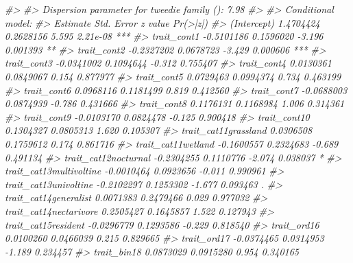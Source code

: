 \documentclass[
]{article}
\newenvironment{Shaded}{\begin{snugshade}}{\end{snugshade}}
\newcommand{\CommentTok}[1]{\textcolor[rgb]{0.56,0.35,0.01}{\textit{#1}}}
\begin{document}
\begin{Shaded}
\begin{Highlighting}[]
\CommentTok{\#\textgreater{} }
\CommentTok{\#\textgreater{} Dispersion parameter for tweedie family (): 7.98 }
\CommentTok{\#\textgreater{} }
\CommentTok{\#\textgreater{} Conditional model:}
\CommentTok{\#\textgreater{}                                 Estimate Std. Error z value Pr(\textgreater{}|z|)    }
\CommentTok{\#\textgreater{} (Intercept)                    1.4704424  0.2628156   5.595 2.21e{-}08 ***}
\CommentTok{\#\textgreater{} trait\_cont1                   {-}0.5101186  0.1596020  {-}3.196 0.001393 ** }
\CommentTok{\#\textgreater{} trait\_cont2                   {-}0.2327202  0.0678723  {-}3.429 0.000606 ***}
\CommentTok{\#\textgreater{} trait\_cont3                   {-}0.0341002  0.1094644  {-}0.312 0.755407    }
\CommentTok{\#\textgreater{} trait\_cont4                    0.0130361  0.0849067   0.154 0.877977    }
\CommentTok{\#\textgreater{} trait\_cont5                    0.0729463  0.0994374   0.734 0.463199    }
\CommentTok{\#\textgreater{} trait\_cont6                    0.0968116  0.1181499   0.819 0.412560    }
\CommentTok{\#\textgreater{} trait\_cont7                   {-}0.0688003  0.0874939  {-}0.786 0.431666    }
\CommentTok{\#\textgreater{} trait\_cont8                    0.1176131  0.1168984   1.006 0.314361    }
\CommentTok{\#\textgreater{} trait\_cont9                   {-}0.0103170  0.0824478  {-}0.125 0.900418    }
\CommentTok{\#\textgreater{} trait\_cont10                   0.1304327  0.0805313   1.620 0.105307    }
\CommentTok{\#\textgreater{} trait\_cat11grassland           0.0306508  0.1759612   0.174 0.861716    }
\CommentTok{\#\textgreater{} trait\_cat11wetland            {-}0.1600557  0.2324683  {-}0.689 0.491134    }
\CommentTok{\#\textgreater{} trait\_cat12nocturnal          {-}0.2304255  0.1110776  {-}2.074 0.038037 *  }
\CommentTok{\#\textgreater{} trait\_cat13multivoltine       {-}0.0010464  0.0923656  {-}0.011 0.990961    }
\CommentTok{\#\textgreater{} trait\_cat13univoltine         {-}0.2102297  0.1253302  {-}1.677 0.093463 .  }
\CommentTok{\#\textgreater{} trait\_cat14generalist          0.0071383  0.2479466   0.029 0.977032    }
\CommentTok{\#\textgreater{} trait\_cat14nectarivore         0.2505427  0.1645857   1.522 0.127943    }
\CommentTok{\#\textgreater{} trait\_cat15resident           {-}0.0296779  0.1293586  {-}0.229 0.818540    }
\CommentTok{\#\textgreater{} trait\_ord16                    0.0100260  0.0466039   0.215 0.829665    }
\CommentTok{\#\textgreater{} trait\_ord17                   {-}0.0374465  0.0314953  {-}1.189 0.234457    }
\CommentTok{\#\textgreater{} trait\_bin18                    0.0873029  0.0915280   0.954 0.340165    }

\end{Highlighting}
\end{Shaded}
\end{document}
